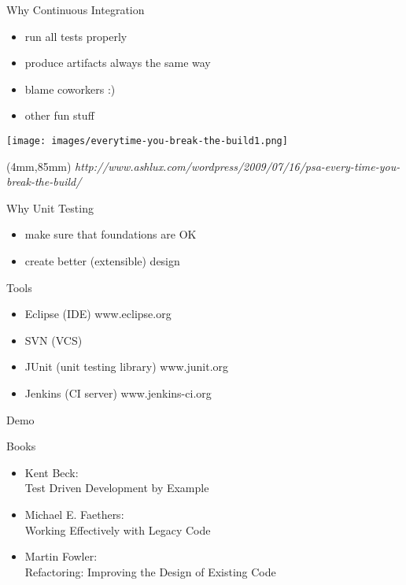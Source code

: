 \documentclass[14pt, t]{beamer}
\newenvironment{reference}[2]{%
  \begin{textblock*}{\textwidth}(#1,#2)
      \footnotesize\it\bgroup\color{gray}}{\egroup\end{textblock*}}
\begin{document}
\begin{frame}{Why Continuous Integration}
	\begin{itemize}
		\item run all tests properly
		\item produce artifacts always the same way
		\item blame coworkers :)
		\item other fun stuff
	\end{itemize}
\end{frame}

\begin{frame}[plain]
	\begin{center} 
		\texttt{[image: images/everytime-you-break-the-build1.png]} 
	\end{center} 
	\begin{reference}{4mm}{85mm}
		http://www.ashlux.com/wordpress/2009/07/16/psa-every-time-you-break-the-build/
	\end{reference}
\end{frame}

\begin{frame}{Why Unit Testing}
	\begin{itemize}
		\item make sure that foundations are OK
		\item create better (extensible) design
	\end{itemize}
\end{frame}

\begin{frame}{Tools}
	\begin{itemize}
		\item Eclipse (IDE) www.eclipse.org
		\item SVN (VCS)
		\item JUnit (unit testing library) www.junit.org
		\item Jenkins (CI server) www.jenkins-ci.org
	\end{itemize}
\end{frame}

\begin{frame}{Demo}
\end{frame}

\begin{frame}{Books}
	\begin{itemize}
		\item Kent Beck:\\ Test Driven Development by Example
		\item Michael E. Faethers:\\ Working Effectively with Legacy Code
		\item Martin Fowler:\\ Refactoring: Improving the Design of Existing Code
	\end{itemize}
\end{frame}
\end{document}
